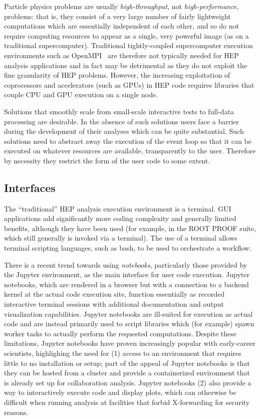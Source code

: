 Particle physics problems are usually \textit{high-throughput}, not \textit{high-performance}, problems: that is, they consist of a very large number of fairly lightweight computations which are essentially independent of each other, and so do not require computing resources to appear as a single, very powerful image (as on a traditional supercomputer). Traditional tightly-coupled supercomputer execution environments such as OpenMPI~\cite{gabriel04:_open_mpi} are therefore not typically needed for HEP analysis applications and in fact may be detrimental as they do not exploit the fine granularity of HEP problems. However, the increasing exploitation of coprocessors and accelerators (such as GPUs) in HEP code requires libraries that couple CPU and GPU execution on a single node.

Solutions that smoothly scale from small-scale interactive tests to full-data processing are desirable. In the absence of such solutions users face a barrier during the development of their analyses which can be quite substantial. Such solutions need to abstract away the execution of the event loop so that it can be executed on whatever resources are available, transparently to the user. Therefore by necessity they restrict the form of the user code to some extent. 


\subsection{Interfaces}

The ``traditional'' HEP analysis execution environment is a terminal. GUI applications add significantly more coding complexity and generally limited benefits, although they have been used (for example, in the ROOT PROOF suite, which still generally is invoked via a terminal). The use of a terminal allows terminal scripting languages, such as bash, to be used to orchestrate a workflow.

There is a recent trend towards using \textit{notebooks}, particularly those provided by the Jupyter environment, as the main interface for user code execution. Jupyter notebooks, which are rendered in a browser but with a connection to a backend kernel at the actual code execution site, function essentially as recorded interactive terminal sessions with additional documentation and output visualization capabilities. Jupyter notebooks are ill-suited for execution as actual code and are instead primarily used to script libraries which (for example) spawn worker tasks to actually perform the requested computations.  Despite these limitations, Jupyter notebooks have proven increasingly popular with early-career scientists, highlighing the need for (1) access to an environment that requires little to no installation or setup; part of the appeal of Jupyter notebooks is that they can be hosted from a cluster and provide a containerized environment that is already set up for collaboration analysis.  Jupyter notebooks (2) also provide a way to interactively execute code and display plots, which can otherwise be difficult when running analysis at facilities that forbid X-forwarding for security reasons.

